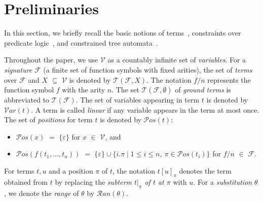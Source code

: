 \documentclass[copyright,creativecommons]{eptcs}
\newcommand{\cF}{\mathcal{F}}
\newcommand{\cV}{\mathcal{V}}
\newcommand{\Var}{{\mathcal{V}ar}}
\newcommand{\Pos}{{\mathcal{P}os}}
\newcommand{\Ran}{{\mathcal{R}an}}
\newcommand{\Terms}{{\mathcal{T}}}
\begin{document}
\section{Preliminaries}
\label{sec:preliminaries}

In this section, we briefly recall the basic notions of
terms~\cite{TATA}, constraints over predicate logic~\cite{Logic}, and
constrained tree automata~\cite{CTA}. 



Throughout the paper, we use $\cV$ as a countably infinite set of
\emph{variables}.
For a \emph{signature} $\cF$ (a finite set of function symbols with fixed
arities), the set of \emph{terms} over $\cF$ and $X$ $\subseteq$ $\cV$ is
denoted by $\Terms(\cF,X)$.  
The notation $f/n$ represents the function symbol $f$ with the arity $n$.
The set $\Terms(\cF,\emptyset)$ of \emph{ground terms} is abbreviated to
$\Terms(\cF)$.
The set of variables appearing in term $t$ is denoted by $\Var(t)$.
A term is called \emph{linear} if any variable appears in the term at
most once. 
The set of \emph{positions} for term $t$ is denoted by $\Pos(t)$:
\begin{itemize}
 \item $\Pos(x)$ $=$ $\{ \varepsilon \}$ for $x$ $\in$ $\cV$, and
 \item $\Pos(f(t_1,\ldots,t_n))$ $=$ $\{ \varepsilon \} \cup \{ i.\pi
       \mid 1 \leq i \leq n, ~\pi \in \Pos(t_i)\}$ for $f/n$ $\in$
       $\cF$.
\end{itemize}
For terms $t,u$ and a position $\pi$ of $t$, the notation $t[u]_\pi$ denotes
the term obtained from $t$ by replacing the \emph{subterm $t|_\pi$ of $t$
at $\pi$} with $u$.
For a \emph{substitution} $\theta$, we denote the \emph{range} of
$\theta$ by $\Ran(\theta)$. 
\end{document}

